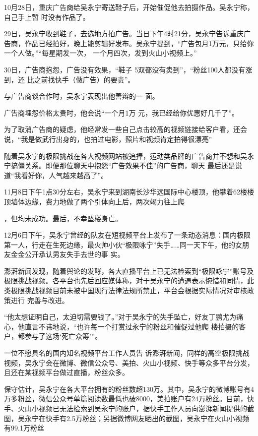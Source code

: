 \documentclass{article}
\begin{document}
10月28日，重庆广告商给吴永宁寄送鞋子后，开始催促他去拍摄作品。吴永宁称，自己手上暂
时没有作品了。 

29日，吴永宁收到鞋子，去选地方拍广告。当日下午4时21分，吴永宁告诉重庆广告商，作品已经拍好，晚上能剪辑好发布。吴永宁提到，“广告包月1万元，只给你一个人做。”“每星期发一次，
一个月四次，发到火山小视频上。” 

30日，广告商抱怨，广告没有效果，“鞋子
\newpage
5双都没有卖到”，“粉丝100人都没有涨到，还
比之前找快手（做广告）的要贵”。 

与广告商谈合作时，吴永宁表现出他善辩的一
面。 

广告商埋怨价格太贵时，他会说“一个月1万
元，我已经给你优惠好几千了”。 

为了取消广告商的疑虑，他经常发一些自己点击较高的视频链接给客户看，还会说，“我是做武行出身的，也拍过电影，照片和视频肯定拍得很漂亮”

随着吴永宁的极限挑战在各大视频网站被追捧，运动类品牌的广告商并不想和吴永宁搞僵关系。即便那位聊天中抱怨“广告效果不佳”的广告商，聊天
最后还是说道“我看好你，人气越来越高了”。 

11月8日下午1点30分左右，吴永宁来到湖南长沙华远国际中心楼顶，他攀着62楼楼顶墙体边缘，费力地做了两个引体向上后，两次竭力往上爬
\newpage

，但均未成功。最后，不幸坠楼身亡。 

12月6日下午，吴永宁曾经的队友在短视频平台上发布了一条动态消息：国内极限第一人，行走在生死边缘，最火帅小伙“极限咏宁”失手……同一天下午，他的女朋友金金公开承认男友失手去世的事
实。 

澎湃新闻发现，随着舆论的发酵，各大直播平台上已无法检索到“极限咏宁”账号及极限挑战视频。各平台也先后回应媒体称，对于吴永宁的遭遇表示惋惜和同情，此类极限挑战视频目前未被中国现行法律法规所禁止，平台会根据实际情况对审核政策进行
完善与改进。 

“他太想证明自己，太迫切需要钱了。”对于吴永宁的失手坠亡，好友丁鹏尤为痛心，他直言不讳地说，“也许每一个打赏过永宁的粉丝和催促过他爬
楼拍摄的客户，都参与了这场‘死亡众筹’”。 

一位不愿具名的国内知名视频平台工作人员告
\newpage
诉澎湃新闻，同样的高空极限挑战视频，吴永宁会在微博、微信公众号、美拍、火山小视频、快手等众多平台分发，且还在某视频平台做过直播，粉丝众多。

保守估计，吴永宁在各大平台拥有的粉丝数超130万。其中，吴永宁的微博账号有4万多粉丝，微信公众号单篇阅读数最低也破8000，美拍账户有24万粉丝。目前，快手、火山小视频已无法检索到吴永宁的账户，据快手工作人员向澎湃新闻提供的截图，吴永宁在快手有2.5万粉丝；另据微博网友晒出的截图，吴永宁在火山小视频有99.1万粉丝
\end{document}
